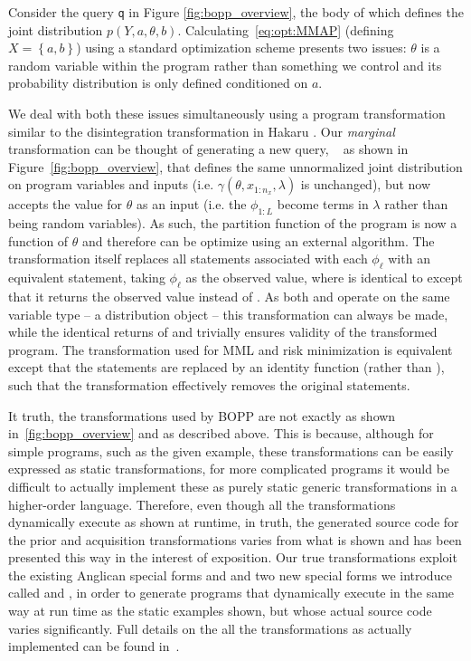 
Consider the  query \texttt{q} in Figure \ref{fig:bopp_overview}, the body of which defines the joint distribution $p\left(Y,a,\theta,b\right)$.   Calculating~\eqref{eq:opt:MMAP} (defining $X=\left\{a,b\right\}$) using a standard optimization scheme presents two issues: $\theta$ is a random variable within the program rather than something we control and its probability distribution is only defined conditioned on $a$.

We deal with both these issues simultaneously using a program transformation similar to the disintegration transformation in Hakaru \citep{zinkov2016composing}. Our \emph{marginal} transformation can be thought of generating a new query, \qmarg~ as shown in Figure~\ref{fig:bopp_overview}, that defines the same unnormalized joint distribution on program variables and inputs (i.e. $\gamma(\theta,x_{1:n_x},\lambda)$ is unchanged), but now accepts the value for $\theta$ as an input (i.e. the $\phi_{1:L}$ become terms in $\lambda$ rather than being random variables).  As such, the partition function of the program is
now a function of $\theta$ and therefore can be optimize using an external algorithm.
The transformation itself replaces all \sample statements associated with each $\phi_{\ell}$ with an equivalent \observes statement, taking $\phi_{\ell}$ as the observed value, where \observes is identical to \observe except that it returns the observed value instead of .  As both \sample and \observe operate on the same variable type -- a distribution object -- this transformation can always be made, while the identical returns of \sample and \observes trivially ensures validity of the transformed program.  The transformation used for MML and risk
minimization
is equivalent except that the \observe statements are replaced by an identity function (rather than \observes), such
that the transformation effectively removes the original \sample statements.

It truth, the transformations used by BOPP are not exactly as shown in~\ref{fig:bopp_overview}
and as described above.  This is because, although for simple programs, such as the given
example, these transformations can be easily expressed as static transformations, for more
complicated programs it would be difficult to actually implement these as purely static
generic transformations in a higher-order language.  Therefore, even though all the
transformations dynamically execute as shown at runtime, in truth, the generated source 
code for the prior and acquisition transformations varies from what is shown and has 
been presented this way in the interest of exposition.  Our true transformations exploit
the existing Anglican special forms  and  and two new
special forms we introduce called  and , in order to generate programs
that dynamically execute in the same way at run time as the static examples shown, but
whose actual source code varies significantly.  Full details on the all the transformations
as actually implemented can be found in~\cite{rainforth2017boppArxiv}.

